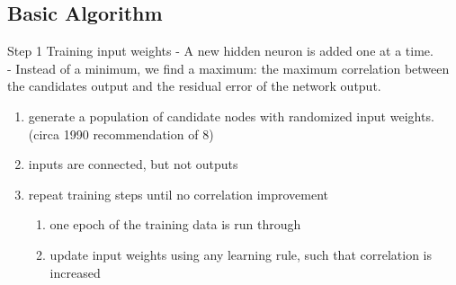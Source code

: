 \documentclass[presentation]{beamer}
\begin{document}
\subsection{Basic Algorithm}
\label{sec:org9411f56}
\begin{frame}[label={sec:org2b7dbb6}]{Step 1 Training input weights}
  - A new hidden neuron is added one at a time. \\
  - Instead of a minimum, we find a maximum: the maximum correlation between the candidates output and the residual error of the network output.

  \begin{enumerate}
  \item generate a population of candidate nodes with randomized input weights.
    (circa 1990 recommendation of 8)
  \item inputs are connected, but not outputs
  \item repeat training steps until no correlation improvement
  \begin{enumerate}
  \item one epoch of the training data is run through
  \item update input weights using any learning rule, such that correlation is increased
  \end{enumerate}
  \end{enumerate}
\end{frame}
\end{document}
